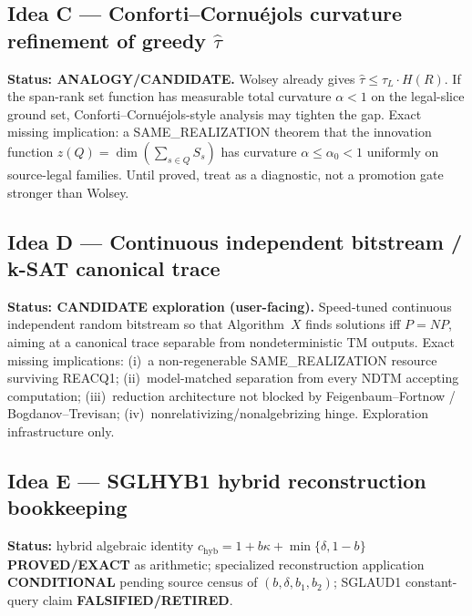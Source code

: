 \documentclass[11pt]{article}
\begin{document}
\subsection*{Idea C --- Conforti--Cornu\'ejols curvature refinement of greedy $\widehat\tau$}
\textbf{Status: ANALOGY/CANDIDATE.}
Wolsey already gives $\widehat\tau\le\tau_L\cdot H(R)$. If the span-rank set function has
measurable total curvature $\alpha<1$ on the legal-slice ground set, Conforti--Cornu\'ejols-style
analysis may tighten the gap. Exact missing implication: a SAME\_REALIZATION theorem that
the innovation function $z(Q)=\dim(\sum_{s\in Q}S_s)$ has curvature $\alpha\le\alpha_0<1$
uniformly on source-legal families. Until proved, treat as a diagnostic, not a promotion gate
stronger than Wolsey.

\subsection*{Idea D --- Continuous independent bitstream / k-SAT canonical trace}
\textbf{Status: CANDIDATE exploration (user-facing).}
Speed-tuned continuous independent random bitstream so that Algorithm~$X$ finds solutions iff
$P=NP$, aiming at a canonical trace separable from nondeterministic TM outputs.
Exact missing implications: (i)~a non-regenerable SAME\_REALIZATION resource surviving REACQ1;
(ii)~model-matched separation from every NDTM accepting computation;
(iii)~reduction architecture not blocked by Feigenbaum--Fortnow / Bogdanov--Trevisan;
(iv)~nonrelativizing/nonalgebrizing hinge. Exploration infrastructure only.

\subsection*{Idea E --- SGLHYB1 hybrid reconstruction bookkeeping}
\textbf{Status:} hybrid algebraic identity
$c_{\mathrm{hyb}}=1+b\kappa+\min\{\delta,1-b\}$ \textbf{PROVED/EXACT} as arithmetic;
specialized reconstruction application \textbf{CONDITIONAL} pending source census of
$(b,\delta,b_1,b_2)$; SGLAUD1 constant-query claim \textbf{FALSIFIED/RETIRED}.
\end{document}
